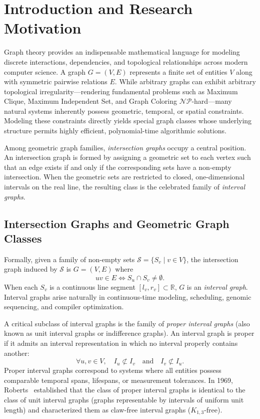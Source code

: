 \chapter{Introduction and Research Motivation}
\label{chap:intro}

Graph theory provides an indispensable mathematical language for modeling discrete interactions, dependencies, and topological relationships across modern computer science. A graph $G = (V, E)$ represents a finite set of entities $V$ along with symmetric pairwise relations $E$. While arbitrary graphs can exhibit arbitrary topological irregularity---rendering fundamental problems such as Maximum Clique, Maximum Independent Set, and Graph Coloring $\mathcal{NP}$-hard---many natural systems inherently possess geometric, temporal, or spatial constraints. Modeling these constraints directly yields special graph classes whose underlying structure permits highly efficient, polynomial-time algorithmic solutions.

Among geometric graph families, \emph{intersection graphs} occupy a central position. An intersection graph is formed by assigning a geometric set to each vertex such that an edge exists if and only if the corresponding sets have a non-empty intersection. When the geometric sets are restricted to closed, one-dimensional intervals on the real line, the resulting class is the celebrated family of \emph{interval graphs}.

\section{Intersection Graphs and Geometric Graph Classes}
\label{sec:intro_intersection_graphs}

Formally, given a family of non-empty sets $\mathcal{S} = \{S_v \mid v \in V\}$, the intersection graph induced by $\mathcal{S}$ is $G = (V, E)$ where
\begin{equation}
    uv \in E \iff S_u \cap S_v \ne \emptyset.
\end{equation}
When each $S_v$ is a continuous line segment $[l_v, r_v] \subset \mathbb{R}$, $G$ is an \emph{interval graph}. Interval graphs arise naturally in continuous-time modeling, scheduling, genomic sequencing, and compiler optimization. 

A critical subclass of interval graphs is the family of \emph{proper interval graphs} (also known as unit interval graphs or indifference graphs). An interval graph is proper if it admits an interval representation in which no interval properly contains another:
\begin{equation}
    \forall u, v \in V, \quad I_u \not\subset I_v \quad \text{and} \quad I_v \not\subset I_u.
\end{equation}
Proper interval graphs correspond to systems where all entities possess comparable temporal spans, lifespans, or measurement tolerances. In 1969, Roberts~\cite{roberts1969indifference} established that the class of proper interval graphs is identical to the class of unit interval graphs (graphs representable by intervals of uniform unit length) and characterized them as claw-free interval graphs ($K_{1,3}$-free).

